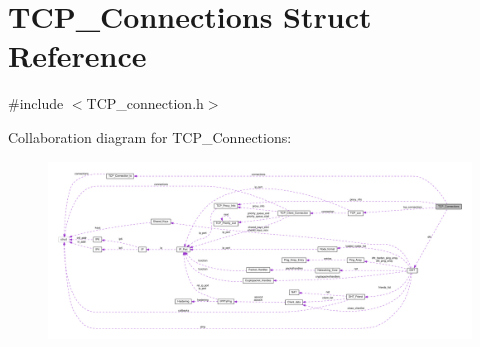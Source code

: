 \hypertarget{struct_t_c_p___connections}{\section{T\+C\+P\+\_\+\+Connections Struct Reference}
\label{struct_t_c_p___connections}
}


{\ttfamily \#include $<$T\+C\+P\+\_\+connection.\+h$>$}



Collaboration diagram for T\+C\+P\+\_\+\+Connections\+:
\nopagebreak
\begin{figure}[H]
\begin{center}
\leavevmode
\includegraphics[width=350pt]{dc/d45/struct_t_c_p___connections__coll__graph}
\end{center}
\end{figure}
